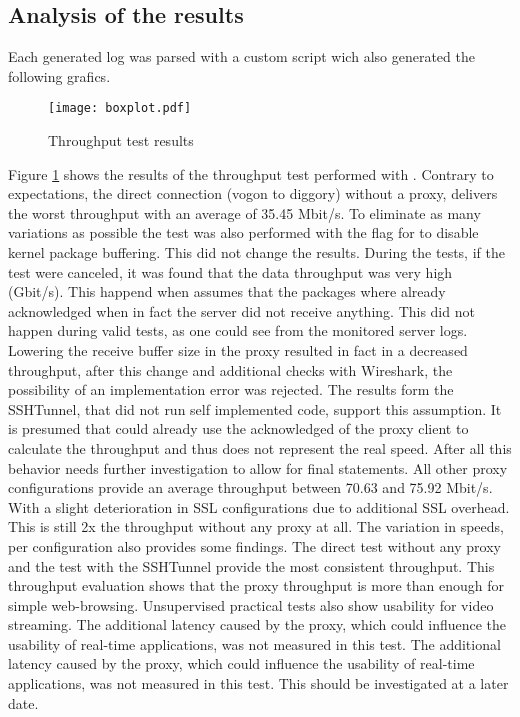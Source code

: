 \documentclass[12pt, a4paper]{scrartcl}
\begin{document}
\subsection{Analysis of the results}
Each generated log was parsed with a custom script wich also generated the following grafics.

\begin{figure}[]
    \centering
    \texttt{[image: boxplot.pdf]}
    \caption{Throughput test results}\label{fig::boxres}
\end{figure}
\noindent Figure \@\ref{fig::boxres} shows the results of the throughput test performed with . Contrary to expectations, the direct connection (vogon to diggory) without a proxy, delivers the worst throughput with an average of 35.45 Mbit/s. To eliminate as many variations as possible the test was also performed with the  flag for  to disable kernel package buffering. This did not change the results.\newline
During the tests, if the test were canceled, it was found that the data throughput was very high (Gbit/s). This happend when  assumes that the packages where already acknowledged when in fact the server did not receive anything. This did not happen during valid tests, as one could see from the monitored server logs. Lowering the receive buffer size in the proxy resulted in fact in a decreased throughput, after this change and additional checks with Wireshark, the possibility of an implementation error was rejected. The results form the SSHTunnel, that did not run self implemented code, support this assumption. It is presumed that  could already use the acknowledged of the proxy client to calculate the throughput and thus does not represent the real speed. After all this behavior needs further investigation to allow for final statements.\newline
All other proxy configurations provide an average throughput between 70.63 and 75.92 Mbit/s. With a slight deterioration in \ac{SSL} configurations due to additional \ac{SSL} overhead. This is still 2x the throughput without any proxy at all. The variation in speeds, per configuration also provides some findings. The direct test without any proxy and the test with the SSHTunnel provide the most consistent throughput.\newline
This throughput evaluation shows that the proxy throughput is more than enough for simple web-browsing. Unsupervised practical tests also show usability for video streaming. The additional latency caused by the proxy, which could influence the usability of real-time applications, was not measured in this test. The additional latency caused by the proxy, which could influence the usability of real-time applications, was not measured in this test. This should be investigated at a later date.
\end{document}
